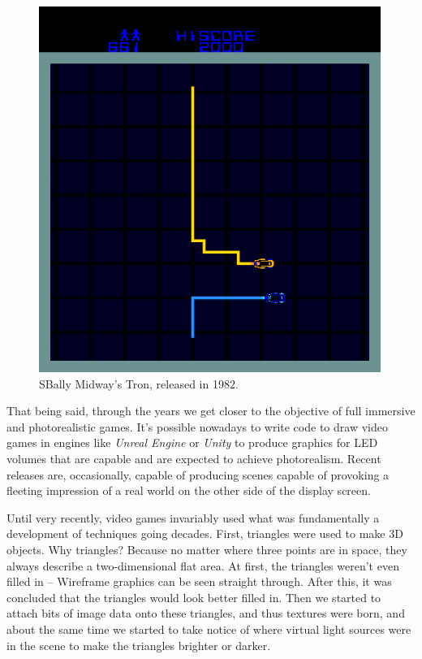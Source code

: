 \documentclass[10pt,journal,compsoc]{IEEEtran}
\begin{document}
\begin{figure}[H]
    \centering
    \includegraphics[scale=0.23]{img/tron.png}
    \caption{SBally Midway's Tron, released in 1982\cite{tron}.}
    \label{fig:mario}
\end{figure}

\par That being said, through the years we get closer to the objective of full immersive and photorealistic games. It's possible nowadays to write code to draw video games in engines like \textit{Unreal Engine} or \textit{Unity} to produce graphics for LED volumes that are capable and are expected to achieve photorealism. Recent releases are, occasionally, capable of producing scenes capable of provoking a fleeting impression of a real world on the other side of the display screen.

\par Until very recently, video games invariably used what was fundamentally a development of techniques going decades. First, triangles were used to make 3D objects. Why triangles? Because no matter where three points are in space, they always describe a two-dimensional flat area. At first, the triangles weren't even filled in – Wireframe graphics can be seen straight through. After this, it was concluded that the triangles would look better filled in. Then we started to attach bits of image data onto these triangles, and thus textures were born, and about the same time we started to take notice of where virtual light sources were in the scene to make the triangles brighter or darker.
\end{document}
